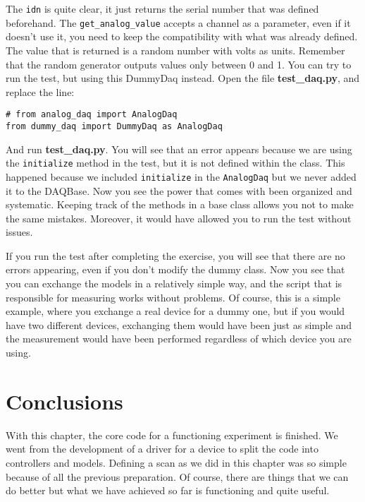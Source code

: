 The \texttt{idn} is quite clear, it just returns the serial number that was defined beforehand. The \texttt{get_analog_value} accepts a channel as a parameter, even if it doesn't use it, you need to keep the compatibility with what was already defined. The value that is returned is a random number with volts as units. Remember that the random generator outputs values only between 0 and 1. You can try to run the test, but using this DummyDaq instead. Open the file \textbf{test\_daq.py}, and replace the line:

\begin{verbatim}
# from analog_daq import AnalogDaq
from dummy_daq import DummyDaq as AnalogDaq
\end{verbatim}

And run \textbf{test\_daq.py}. You will see that an error appears because we are using the \texttt{initialize} method in the test, but it is not defined within the class. This happened because we included \texttt{initialize} in the \texttt{AnalogDaq} but we never added it to the DAQBase. Now you see the power that comes with been organized and systematic. Keeping track of the methods in a base class allows you not to make the same mistakes. Moreover, it would have allowed you to run the test without issues.


If you run the test after completing the exercise, you will see that there are no errors appearing, even if you don't modify the dummy class. Now you see that you can exchange the models in a relatively simple way, and the script that is responsible for measuring works without problems. Of course, this is a simple example, where you exchange a real device for a dummy one, but if you would have two different devices, exchanging them would have been just as simple and the measurement would have been performed regardless of which device you are using.


\section{Conclusions}\label{experiment-model-conclusions}
With this chapter, the core code for a functioning experiment is finished. We went from the development of a driver for a device to split the code into controllers and models. Defining a scan as we did in this chapter was so simple because of all the previous preparation. Of course, there are things that we can do better but what we have achieved so far is functioning and quite useful.

